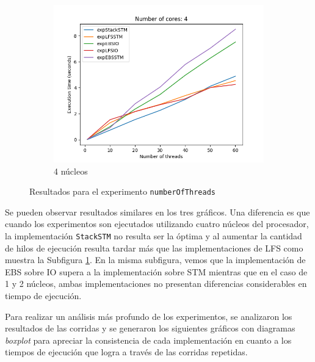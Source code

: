 \begin{figure}[H]
\begin{subfigure}[b]{0.5\textwidth}
        \includegraphics[width=\textwidth]{images/numberOfThreads/plots/4.png}
        \caption{4 núcleos}
        \label{subfig:numberOfThreads-4core}
    \end{subfigure}
    \caption{Resultados para el experimento \texttt{numberOfThreads}}
    \label{fig:numberOfThreads-all}
\end{figure}
Se pueden observar resultados similares en los tres gráficos. Una diferencia es que cuando los experimentos son ejecutados utilizando cuatro núcleos del procesador, la implementación \texttt{StackSTM} no resulta ser la óptima y al aumentar la cantidad de hilos de ejecución resulta tardar más que las implementaciones de LFS como muestra la Subfigura \ref{subfig:numberOfThreads-4core}. En la misma subfigura, vemos que la implementación de EBS sobre IO supera a la implementación sobre STM mientras que en el caso de 1 y 2 núcleos, ambas implementaciones no presentan diferencias considerables en tiempo de ejecución.

Para realizar un análisis más profundo de los experimentos, se analizaron los resultados de las corridas y se generaron los siguientes gráficos con diagramas \emph{boxplot} para apreciar la consistencia de cada implementación en cuanto a los tiempos de ejecución que logra a través de las corridas repetidas.

